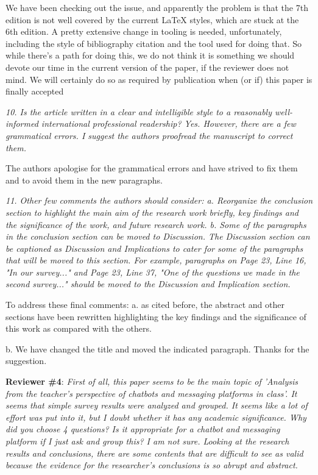 \documentclass{letter}
\begin{document}
We have been checking out the issue, and apparently the problem is that the 7th
edition is not well covered by the current LaTeX styles, which are stuck at the
6th edition. A pretty extensive change in tooling is needed, unfortunately,
including the style of bibliography citation and the tool used for doing
that. So while there's a path for doing this, we do not think it is something we
should devote our time in the current version of the paper, if the reviewer does
not mind. We will certainly do so as required by publication when (or if) this
paper is finally accepted

{\it 10.     Is the article written in a clear and intelligible style to a reasonably well-informed international professional readership? Yes. However, there are a few grammatical errors. I suggest the authors proofread the manuscript to correct them.}

The authors apologise for the grammatical errors and have strived to fix them and to avoid them in the new paragraphs.

{\it 11.     Other few comments the authors should consider:
   a.   Reorganize the conclusion section to highlight the main aim of the research work briefly, key findings and the significance of the work, and future research work.
   b.   Some of the paragraphs in the conclusion section can be moved to Discussion. The Discussion section can be captioned as Discussion and Implications to cater for some of the paragraphs that will be moved to this section. For example, paragraphs on Page 23, Line 16, "In our survey..." and Page 23, Line 37, "One of the questions we made in the second survey..." should be moved to the Discussion and Implication section.}

To address these final comments:
    a. as cited before, the abstract and other sections have been rewritten
    highlighting the key findings and the significance of this work as compared
    with the others.

    b. We have changed the title and moved the indicated paragraph. Thanks for
    the suggestion.


{\bf Reviewer \#4}: {\it First of all, this paper seems to be the main topic of 'Analysis from the teacher's perspective of chatbots and messaging platforms in class'.
It seems that simple survey results were analyzed and grouped.
It seems like a lot of effort was put into it, but I doubt whether it has any academic significance.
Why did you choose 4 questions? Is it appropriate for a chatbot and messaging platform if I just ask and group this? I am not sure.
Looking at the research results and conclusions, there are some contents that are difficult to see as valid because the evidence for the researcher's conclusions is so abrupt and abstract.}
\end{document}
